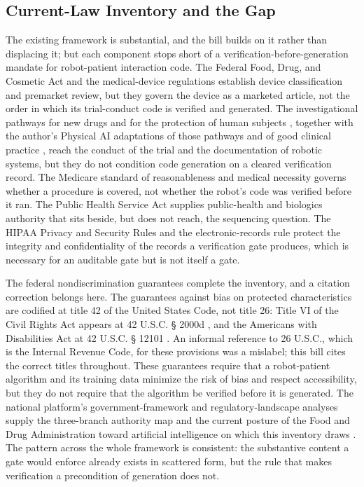 \subsection{Current-Law Inventory and the Gap}

The existing framework is substantial, and the bill builds on it rather than
displacing it; but each component stops short of a verification-before-generation
mandate for robot-patient interaction code. The Federal Food, Drug, and Cosmetic
Act \cite{usc-fdca} and the medical-device regulations \cite{cfr-devices}
establish device classification and premarket review, but they govern the device
as a marketed article, not the order in which its trial-conduct code is verified
and generated. The investigational pathways for new drugs and for the protection
of human subjects \cite{cfr-part312, cfr-part50}, together with the author's
Physical AI adaptations of those pathways and of good clinical practice
\cite{kawchak2026cfr312, kawchak2026cfr50, kawchak2026iche6r3}, reach the conduct
of the trial and the documentation of robotic systems, but they do not condition
code generation on a cleared verification record. The Medicare standard of
reasonableness and medical necessity \cite{usc-1395y} governs whether a procedure
is covered, not whether the robot's code was verified before it ran. The Public
Health Service Act \cite{usc-phsa} supplies public-health and biologics
authority that sits beside, but does not reach, the sequencing question. The
HIPAA Privacy and Security Rules \cite{cfr-hipaa} and the electronic-records rule
\cite{cfr-part11} protect the integrity and confidentiality of the records a
verification gate produces, which is necessary for an auditable gate but is not
itself a gate.

The federal nondiscrimination guarantees complete the inventory, and a citation
correction belongs here. The guarantees against bias on protected
characteristics are codified at title 42 of the United States Code, not title 26:
Title VI of the Civil Rights Act appears at 42 U.S.C. § 2000d
\cite{usc-titlevi}, and the Americans with Disabilities Act at 42 U.S.C. § 12101
\cite{usc-ada}. An informal reference to 26 U.S.C., which is the Internal Revenue
Code, for these provisions was a mislabel; this bill cites the correct titles
throughout. These guarantees require that a robot-patient algorithm and its
training data minimize the risk of bias and respect accessibility, but they do
not require that the algorithm be verified before it is generated. The national
platform's government-framework and regulatory-landscape analyses supply the
three-branch authority map and the current posture of the Food and Drug
Administration toward artificial intelligence on which this inventory draws
\cite{kawchak2026national}. The pattern across the whole framework is consistent:
the substantive content a gate would enforce already exists in scattered form,
but the rule that makes verification a precondition of generation does not.

